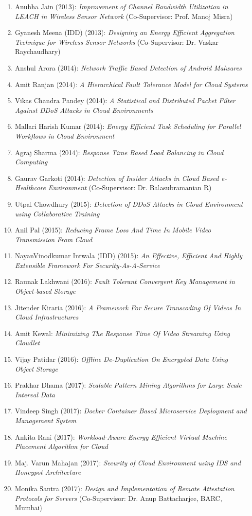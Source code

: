 \begin{enumerate}
\item		Anubha Jain (2013): 	\textit{	 Improvement of Channel Bandwidth Utilization in LEACH in Wireless Sensor Network} (Co-Supervisor:	Prof. Manoj Misra)	
\item		Gyanesh Meena (IDD) (2013): 	\textit{	Designing an Energy Efficient Aggregation Technique for Wireless Sensor Networks} (Co-Supervisor: Dr. Vaskar Raychaudhary)
\item		Anshul Arora (2014): 	\textit{	Network Traffic Based Detection of Android Malwares}	
\item		Amit Ranjan (2014): 	\textit{	A Hierarchical Fault Tolerance Model for Cloud Systems}	
\item     Vikas Chandra Pandey (2014): 	\textit{ A Statistical and Distributed Packet Filter Against DDoS Attacks in Cloud Environments} 
\item		Mallari Harish Kumar (2014): 	\textit{	Energy Efficient Task Scheduling for Parallel Workflows in Cloud Environment}	
\item		Agraj Sharma (2014): 	\textit{	Response Time Based Load Balancing in Cloud Computing} 
\item		Gaurav Garkoti (2014): 	\textit{	Detection of Insider Attacks in Cloud Based e-Healthcare Environment} (Co-Supervisor: Dr. Balasubramanian R)
\item		Utpal Chowdhury (2015): 	\textit{	Detection of DDoS Attacks in Cloud Environment using Collaborative Training}
\item		Anil Pal (2015): 	\textit{	Reducing Frame Loss And Time In Mobile Video Transmission From Cloud}	
\item		NayanVinodkumar Intwala (IDD) (2015): 	\textit{	An Effective, Efficient And Highly Extensible Framework For Security-As-A-Service}	
\item		Raunak Lakhwani (2016): 	\textit{Fault Tolerant Convergent Key Management in Object-based Storage}
\item		Jitender Kiraria (2016): 	\textit{	A Framework For Secure Transcoding Of Videos In Cloud Infrastructures}
\item		Amit Kewal: 	\textit{	Minimizing The Response Time Of Video Streaming Using Cloudlet}
\item		Vijay Patidar (2016): 	\textit{	Offline De-Duplication On Encrypted Data Using Object Storage}	
\item		Prakhar Dhama (2017): 	\textit{	Scalable Pattern Mining Algorithms for Large Scale Interval Data}
\item		Vindeep Singh (2017): 	\textit{	Docker Container Based Microservice Deployment and Management System}	
\item		Ankita Rani (2017): 	\textit{	Workload-Aware Energy Efficient Virtual Machine Placement Algorithm for Cloud}	
\item		Maj. Varun Mahajan (2017): 	\textit{	Security of Cloud Environment using IDS and Honeypot Architecture}
\item		Monika Santra (2017): 	\textit{	Design and Implementation of Remote Attestation Protocols for Servers} (Co-Supervisor:	Dr. Anup Battacharjee, BARC, Mumbai)

	\end{enumerate}
